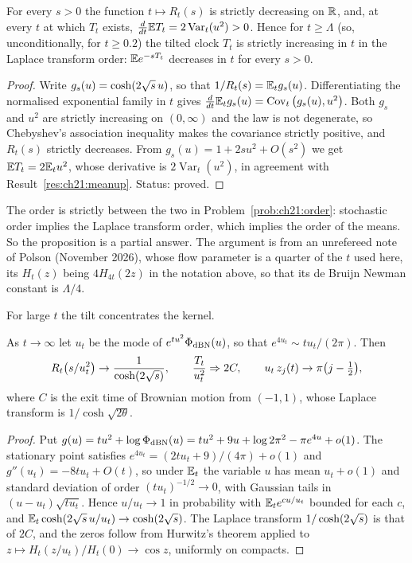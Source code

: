 \begin{proposition}\label{prop:ch21:ltorder}For every $s>0$ the function $t\mapsto R_t(s)$ is strictly decreasing on $\mathbb{R}$, and, at every $t$ at which $T_t$ exists, $\frac d{dt}\mathbb{E} T_t=2\operatorname{Var}_t(u^2)>0$. Hence for $t\ge\Lambda$ (so, unconditionally, for $t\ge0.2$) the tilted clock $T_t$ is strictly increasing in $t$ in the Laplace transform order: $\mathbb{E} e^{-sT_t}$ decreases in $t$ for every $s>0$.\end{proposition}

\begin{proof}Write $g_s(u)=\cosh(2\sqrt{s}\,u)$, so that $1/R_t(s)=\mathbb{E}_tg_s(u)$. Differentiating the normalised exponential family in $t$ gives $\frac d{dt}\mathbb{E}_tg_s(u)=\operatorname{Cov}_t\big(g_s(u),u^2\big)$. Both $g_s$ and $u^2$ are strictly increasing on $(0,\infty)$ and the law is not degenerate, so Chebyshev's association inequality makes the covariance strictly positive, and $R_t(s)$ strictly decreases. From $g_s(u)=1+2su^2+O(s^2)$ we get $\mathbb{E} T_t=2\mathbb{E}_tu^2$, whose derivative is $2\operatorname{Var}_t(u^2)$, in agreement with Result~\ref{res:ch21:meanup}. Status: proved.\end{proof}

The order is strictly between the two in Problem~\ref{prob:ch21:order}: stochastic order implies the Laplace transform order, which implies the order of the means. So the proposition is a partial answer. The argument is from an unrefereed note of Polson (November 2026), whose flow parameter is a quarter of the $t$ used here, its $H_t(z)$ being $4H_{4t}(2z)$ in the notation above, so that its de Bruijn Newman constant is $\Lambda/4$.

For large $t$ the tilt concentrates the kernel.

\begin{proposition}\label{xg:prop:large}
As $t\to\infty$ let $u_t$ be the mode of $e^{tu^2}\Phi_{\rm dBN}(u)$, so that $e^{4u_t}\sim tu_t/(2\pi)$. Then
\[
R_t\big(s/u_t^2\big)\to\frac1{\cosh(2\sqrt{s})},\qquad\frac{T_t}{u_t^2}\Rightarrow2C,\qquad u_t\,z_j(t)\to\pi\big(j-\tfrac12\big),
\]
where $C$ is the exit time of Brownian motion from $(-1,1)$, whose Laplace transform is $1/\cosh\sqrt{2\theta}$.
\end{proposition}

\begin{proof}
Put $g(u)=tu^2+\log\Phi_{\rm dBN}(u)=tu^2+9u+\log2\pi^2-\pi e^{4u}+o(1)$. The stationary point satisfies $e^{4u_t}=(2tu_t+9)/(4\pi)+o(1)$ and $g''(u_t)=-8tu_t+O(t)$, so under $\mathbb{E}_t$ the variable $u$ has mean $u_t+o(1)$ and standard deviation of order $(tu_t)^{-1/2}\to0$, with Gaussian tails in $(u-u_t)\sqrt{tu_t}$. Hence $u/u_t\to1$ in probability with $\mathbb{E}_te^{cu/u_t}$ bounded for each $c$, and $\mathbb{E}_t\cosh(2\sqrt{s}\,u/u_t)\to\cosh(2\sqrt{s})$. The Laplace transform $1/\cosh(2\sqrt{s})$ is that of $2C$, and the zeros follow from Hurwitz's theorem applied to $z\mapsto H_t(z/u_t)/H_t(0)\to\cos z$, uniformly on compacts.
\end{proof}

